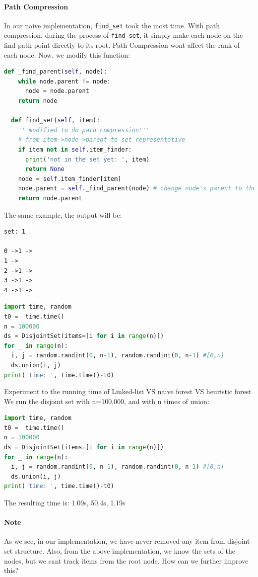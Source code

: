 \documentclass[../main.tex]{subfiles}
\begin{document}
\paragraph{Path Compression}
In our naive implementation, \texttt{find\_set} took the most time. With path compression, during the process of \texttt{find\_set}, it simply make each node on the find path point directly to its root. Path Compression wont affect the rank of each node. Now, we modify this function:
\begin{lstlisting}[language=Python]
  def _find_parent(self, node):
    while node.parent != node:
      node = node.parent
    return node
    
  def find_set(self, item):
    '''modified to do path compression'''
    # from item->node->parent to set representative
    if item not in self.item_finder:
      print('not in the set yet: ', item)
      return None
    node = self.item_finder[item]
    node.parent = self._find_parent(node) # change node's parent to the root node
    return node.parent
\end{lstlisting}
The same example, the output will be:
\begin{lstlisting}[numbers=none]
set: 1

0 ->1 -> 
1 -> 
2 ->1 -> 
3 ->1 -> 
4 ->1 ->
\end{lstlisting}
\begin{lstlisting}[language=Python]
import time, random
t0 =  time.time()
n = 100000
ds = DisjointSet(items=[i for i in range(n)])
for _ in range(n):
  i, j = random.randint(0, n-1), random.randint(0, n-1) #[0,n]
  ds.union(i, j)
print('time: ', time.time()-t0)
\end{lstlisting} 
\begin{bclogo}[couleur = blue!30, arrondi=0.1,logo=\bccrayon,ombre=true]{Experiment to the running time of Linked-list VS naive forest VS heuristic forest} We run the disjoint set with n=100,000, and with n times of union: 
\begin{lstlisting}[language=Python]
import time, random
t0 =  time.time()
n = 100000
ds = DisjointSet(items=[i for i in range(n)])
for _ in range(n):
  i, j = random.randint(0, n-1), random.randint(0, n-1) #[0,n]
  ds.union(i, j)
print('time: ', time.time()-t0)
\end{lstlisting}
The resulting time is: 1.09s, 50.4s, 1.19s
\end{bclogo}
\paragraph{Note} As we see, in our implementation, we have never removed any item from disjoint-set structure. Also, from the above implementation, we know the sets of the nodes, but we cant track items from the root node. How can we further improve this?
\end{document}
